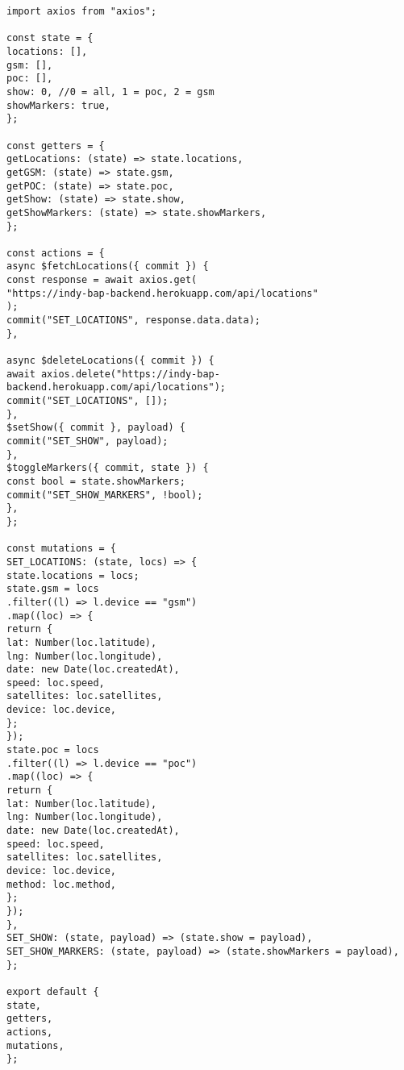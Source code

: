 \begin{verbatim}
import axios from "axios";

const state = {
locations: [],
gsm: [],
poc: [],
show: 0, //0 = all, 1 = poc, 2 = gsm
showMarkers: true,
};

const getters = {
getLocations: (state) => state.locations,
getGSM: (state) => state.gsm,
getPOC: (state) => state.poc,
getShow: (state) => state.show,
getShowMarkers: (state) => state.showMarkers,
};

const actions = {
async $fetchLocations({ commit }) {
const response = await axios.get(
"https://indy-bap-backend.herokuapp.com/api/locations"
);
commit("SET_LOCATIONS", response.data.data);
},

async $deleteLocations({ commit }) {
await axios.delete("https://indy-bap-backend.herokuapp.com/api/locations");
commit("SET_LOCATIONS", []);
},
$setShow({ commit }, payload) {
commit("SET_SHOW", payload);
},
$toggleMarkers({ commit, state }) {
const bool = state.showMarkers;
commit("SET_SHOW_MARKERS", !bool);
},
};

const mutations = {
SET_LOCATIONS: (state, locs) => {
state.locations = locs;
state.gsm = locs
.filter((l) => l.device == "gsm")
.map((loc) => {
return {
lat: Number(loc.latitude),
lng: Number(loc.longitude),
date: new Date(loc.createdAt),
speed: loc.speed,
satellites: loc.satellites,
device: loc.device,
};
});
state.poc = locs
.filter((l) => l.device == "poc")
.map((loc) => {
return {
lat: Number(loc.latitude),
lng: Number(loc.longitude),
date: new Date(loc.createdAt),
speed: loc.speed,
satellites: loc.satellites,
device: loc.device,
method: loc.method,
};
});
},
SET_SHOW: (state, payload) => (state.show = payload),
SET_SHOW_MARKERS: (state, payload) => (state.showMarkers = payload),
};

export default {
state,
getters,
actions,
mutations,
};
\end{verbatim}